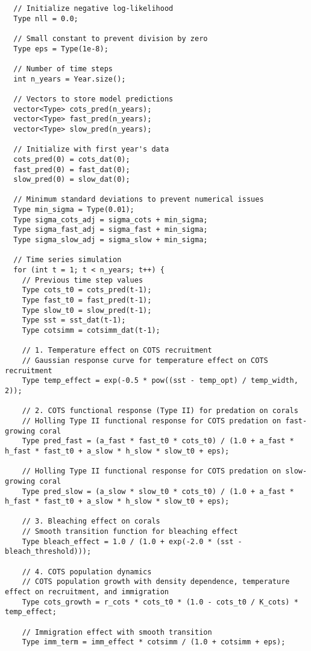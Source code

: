 \begin{lstlisting}
  // Initialize negative log-likelihood
  Type nll = 0.0;
  
  // Small constant to prevent division by zero
  Type eps = Type(1e-8);
  
  // Number of time steps
  int n_years = Year.size();
  
  // Vectors to store model predictions
  vector<Type> cots_pred(n_years);
  vector<Type> fast_pred(n_years);
  vector<Type> slow_pred(n_years);
  
  // Initialize with first year's data
  cots_pred(0) = cots_dat(0);
  fast_pred(0) = fast_dat(0);
  slow_pred(0) = slow_dat(0);
  
  // Minimum standard deviations to prevent numerical issues
  Type min_sigma = Type(0.01);
  Type sigma_cots_adj = sigma_cots + min_sigma;
  Type sigma_fast_adj = sigma_fast + min_sigma;
  Type sigma_slow_adj = sigma_slow + min_sigma;
  
  // Time series simulation
  for (int t = 1; t < n_years; t++) {
    // Previous time step values
    Type cots_t0 = cots_pred(t-1);
    Type fast_t0 = fast_pred(t-1);
    Type slow_t0 = slow_pred(t-1);
    Type sst = sst_dat(t-1);
    Type cotsimm = cotsimm_dat(t-1);
    
    // 1. Temperature effect on COTS recruitment
    // Gaussian response curve for temperature effect on COTS recruitment
    Type temp_effect = exp(-0.5 * pow((sst - temp_opt) / temp_width, 2));
    
    // 2. COTS functional response (Type II) for predation on corals
    // Holling Type II functional response for COTS predation on fast-growing coral
    Type pred_fast = (a_fast * fast_t0 * cots_t0) / (1.0 + a_fast * h_fast * fast_t0 + a_slow * h_slow * slow_t0 + eps);
    
    // Holling Type II functional response for COTS predation on slow-growing coral
    Type pred_slow = (a_slow * slow_t0 * cots_t0) / (1.0 + a_fast * h_fast * fast_t0 + a_slow * h_slow * slow_t0 + eps);
    
    // 3. Bleaching effect on corals
    // Smooth transition function for bleaching effect
    Type bleach_effect = 1.0 / (1.0 + exp(-2.0 * (sst - bleach_threshold)));
    
    // 4. COTS population dynamics
    // COTS population growth with density dependence, temperature effect on recruitment, and immigration
    Type cots_growth = r_cots * cots_t0 * (1.0 - cots_t0 / K_cots) * temp_effect;
    
    // Immigration effect with smooth transition
    Type imm_term = imm_effect * cotsimm / (1.0 + cotsimm + eps);
    

\end{lstlisting}
